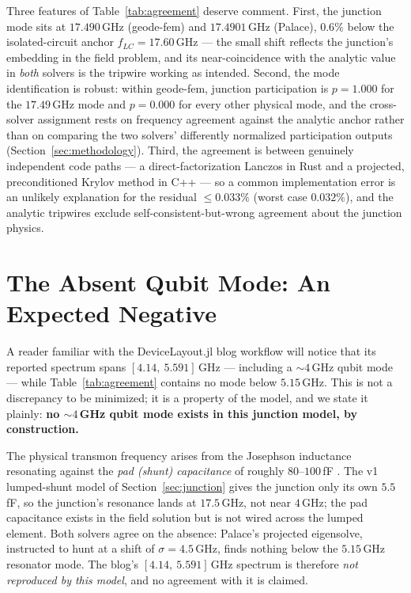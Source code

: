 \documentclass{anvil-paper}
\begin{document}
Three features of Table~\ref{tab:agreement} deserve comment. First, the
junction mode sits at $17.490$\,GHz (geode-fem) and $17.4901$\,GHz
(Palace), $0.6\%$ below the isolated-circuit anchor
$f_{LC} = 17.60$\,GHz --- the small shift reflects the junction's embedding
in the field problem, and its near-coincidence with the analytic value in
\emph{both} solvers is the tripwire working as intended. Second, the mode
identification is robust: within geode-fem, junction participation is
$p = 1.000$ for the $17.49$\,GHz mode and $p = 0.000$ for every other
physical mode, and the cross-solver assignment rests on frequency agreement
against the analytic anchor rather than on comparing the two solvers'
differently normalized participation outputs
(Section~\ref{sec:methodology}). Third, the agreement is between genuinely
independent code paths --- a direct-factorization Lanczos in Rust and a
projected, preconditioned Krylov method in C++ --- so a common
implementation error is an unlikely explanation for the residual
$\leq 0.033\%$ (worst case $0.032\%$), and the analytic tripwires exclude
self-consistent-but-wrong agreement about the junction physics.

\section{The Absent Qubit Mode: An Expected Negative}
\label{sec:absent-mode}

A reader familiar with the DeviceLayout.jl blog workflow
\citep{devicelayout-blog} will notice that its reported spectrum spans
$[4.14,\ 5.591]$\,GHz --- including a ${\sim}4$\,GHz qubit mode --- while
Table~\ref{tab:agreement} contains no mode below $5.15$\,GHz. This is not a
discrepancy to be minimized; it is a property of the model, and we state it
plainly: \textbf{no ${\sim}4$\,GHz qubit mode exists in this junction model,
by construction.}

The physical transmon frequency arises from the Josephson inductance
resonating against the \emph{pad (shunt) capacitance} of roughly
$80$--$100$\,fF \citep{koch2007}. The v1 lumped-shunt model of
Section~\ref{sec:junction} gives the junction only its own $5.5$\,fF, so
the junction's resonance lands at $17.5$\,GHz, not near $4$\,GHz; the pad
capacitance exists in the field solution but is not wired across the
lumped element. Both solvers agree on the absence: Palace's projected
eigensolve, instructed to hunt at a shift of $\sigma = 4.5$\,GHz, finds
nothing below the $5.15$\,GHz resonator mode. The blog's
$[4.14,\ 5.591]$\,GHz spectrum is therefore \emph{not reproduced by this
model}, and no agreement with it is claimed.
\end{document}
